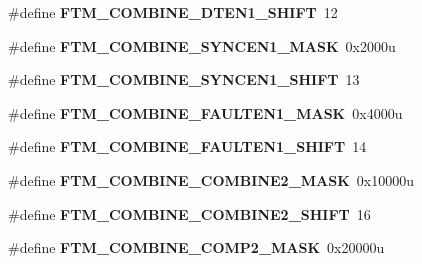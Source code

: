 \begin{DoxyCompactItemize}
\item 
\hypertarget{group___f_t_m___register___masks_ga6a1bc35db122f0f887a50b1ac9157657}{}\#define {\bfseries F\+T\+M\+\_\+\+C\+O\+M\+B\+I\+N\+E\+\_\+\+D\+T\+E\+N1\+\_\+\+S\+H\+I\+F\+T}~12\label{group___f_t_m___register___masks_ga6a1bc35db122f0f887a50b1ac9157657}

\item 
\hypertarget{group___f_t_m___register___masks_gad635d904007b2c80c096efe6f5a8c7c2}{}\#define {\bfseries F\+T\+M\+\_\+\+C\+O\+M\+B\+I\+N\+E\+\_\+\+S\+Y\+N\+C\+E\+N1\+\_\+\+M\+A\+S\+K}~0x2000u\label{group___f_t_m___register___masks_gad635d904007b2c80c096efe6f5a8c7c2}

\item 
\hypertarget{group___f_t_m___register___masks_ga5190e8c0896bf03060b19eb8b4a0c524}{}\#define {\bfseries F\+T\+M\+\_\+\+C\+O\+M\+B\+I\+N\+E\+\_\+\+S\+Y\+N\+C\+E\+N1\+\_\+\+S\+H\+I\+F\+T}~13\label{group___f_t_m___register___masks_ga5190e8c0896bf03060b19eb8b4a0c524}

\item 
\hypertarget{group___f_t_m___register___masks_ga80468385e5f9888483457adac7de12f1}{}\#define {\bfseries F\+T\+M\+\_\+\+C\+O\+M\+B\+I\+N\+E\+\_\+\+F\+A\+U\+L\+T\+E\+N1\+\_\+\+M\+A\+S\+K}~0x4000u\label{group___f_t_m___register___masks_ga80468385e5f9888483457adac7de12f1}

\item 
\hypertarget{group___f_t_m___register___masks_gaf889dddf3bfe69e1fde16e5386ab5204}{}\#define {\bfseries F\+T\+M\+\_\+\+C\+O\+M\+B\+I\+N\+E\+\_\+\+F\+A\+U\+L\+T\+E\+N1\+\_\+\+S\+H\+I\+F\+T}~14\label{group___f_t_m___register___masks_gaf889dddf3bfe69e1fde16e5386ab5204}

\item 
\hypertarget{group___f_t_m___register___masks_gaf6def48c41b38acef5263e8d8f440901}{}\#define {\bfseries F\+T\+M\+\_\+\+C\+O\+M\+B\+I\+N\+E\+\_\+\+C\+O\+M\+B\+I\+N\+E2\+\_\+\+M\+A\+S\+K}~0x10000u\label{group___f_t_m___register___masks_gaf6def48c41b38acef5263e8d8f440901}

\item 
\hypertarget{group___f_t_m___register___masks_ga9ec484c5c6125951d7528fe755040d09}{}\#define {\bfseries F\+T\+M\+\_\+\+C\+O\+M\+B\+I\+N\+E\+\_\+\+C\+O\+M\+B\+I\+N\+E2\+\_\+\+S\+H\+I\+F\+T}~16\label{group___f_t_m___register___masks_ga9ec484c5c6125951d7528fe755040d09}

\item 
\hypertarget{group___f_t_m___register___masks_gaf15b9cb1ec9fce30f4442d387e6e6c11}{}\#define {\bfseries F\+T\+M\+\_\+\+C\+O\+M\+B\+I\+N\+E\+\_\+\+C\+O\+M\+P2\+\_\+\+M\+A\+S\+K}~0x20000u\label{group___f_t_m___register___masks_gaf15b9cb1ec9fce30f4442d387e6e6c11}


\end{DoxyCompactItemize}
